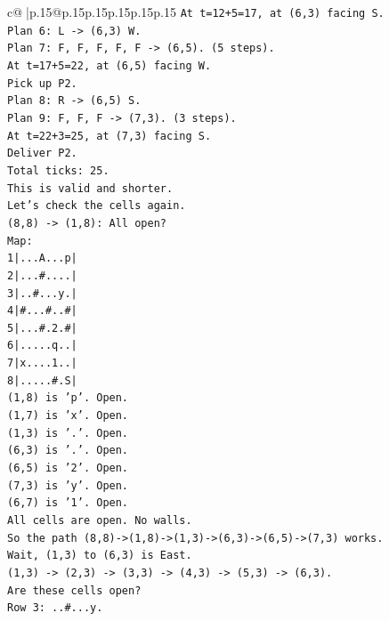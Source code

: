 \documentclass{article}
\begin{document}
{\begin{supertabular}{c@{$\;$}|p{.15\linewidth}@{}p{.15\linewidth}p{.15\linewidth}p{.15\linewidth}p{.15\linewidth}p{.15\linewidth}}
{{{\texttt{At t=12+5=17, at (6,3) facing S.} \\
\texttt{Plan 6: L {-}> (6,3) W.} \\
\texttt{Plan 7: F, F, F, F, F {-}> (6,5). (5 steps).} \\
\texttt{At t=17+5=22, at (6,5) facing W.} \\
\texttt{Pick up P2.} \\
\texttt{Plan 8: R {-}> (6,5) S.} \\
\texttt{Plan 9: F, F, F {-}> (7,3). (3 steps).} \\
\texttt{At t=22+3=25, at (7,3) facing S.} \\
\texttt{Deliver P2.} \\
\texttt{Total ticks: 25.} \\
\texttt{This is valid and shorter.} \\
\texttt{Let's check the cells again.} \\
\texttt{(8,8) {-}> (1,8): All open?} \\
\texttt{Map:} \\
\texttt{1|...A...p|} \\
\texttt{2|...\#....|} \\
\texttt{3|..\#...y.|} \\
\texttt{4|\#...\#..\#|} \\
\texttt{5|...\#.2.\#|} \\
\texttt{6|.....q..|} \\
\texttt{7|x....1..|} \\
\texttt{8|.....\#.S|} \\
\texttt{(1,8) is 'p'. Open.} \\
\texttt{(1,7) is 'x'. Open.} \\
\texttt{(1,3) is '.'. Open.} \\
\texttt{(6,3) is '.'. Open.} \\
\texttt{(6,5) is '2'. Open.} \\
\texttt{(7,3) is 'y'. Open.} \\
\texttt{(6,7) is '1'. Open.} \\
\texttt{All cells are open. No walls.} \\
\texttt{So the path (8,8){-}>(1,8){-}>(1,3){-}>(6,3){-}>(6,5){-}>(7,3) works.} \\
\texttt{Wait, (1,3) to (6,3) is East.} \\
\texttt{(1,3) {-}> (2,3) {-}> (3,3) {-}> (4,3) {-}> (5,3) {-}> (6,3).} \\
\texttt{Are these cells open?} \\
\texttt{Row 3: ..\#...y.} \\
}}}
\end{supertabular}}
\end{document}
